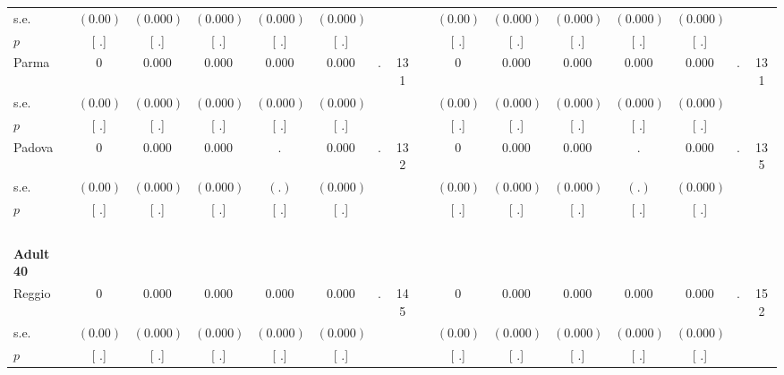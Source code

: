 \begin{longtable}{L{8em} c c c c c c c p{1em} c c c c c c c}
\quad \quad \quad \quad s.e.& $ (     0.00)$ & $ (    0.000)$ & $ (    0.000)$ & $ (    0.000)$ & $ (    0.000)$ & & & & $ (     0.00)$ & $ (    0.000)$ & $ (    0.000)$ & $ (    0.000)$ & $ (    0.000)$ & &  \\*
\quad \quad \quad \quad $ p$ & [        .] & [        .] & [        .] & [        .] & [        .] & & & & [        .] & [        .] & [        .] & [        .] & [        .] & &  \\[1em]
\quad \quad \quad Parma& 0 &     0.000 &     0.000 &     0.000 &     0.000 &         . &       131 & & 0 &     0.000 &     0.000 &     0.000 &     0.000 &         . &       131  \\*
\quad \quad \quad \quad s.e.& $ (     0.00)$ & $ (    0.000)$ & $ (    0.000)$ & $ (    0.000)$ & $ (    0.000)$ & & & & $ (     0.00)$ & $ (    0.000)$ & $ (    0.000)$ & $ (    0.000)$ & $ (    0.000)$ & &  \\*
\quad \quad \quad \quad $ p$ & [        .] & [        .] & [        .] & [        .] & [        .] & & & & [        .] & [        .] & [        .] & [        .] & [        .] & &  \\[1em]
\quad \quad \quad Padova& 0 &     0.000 &     0.000 &         . &     0.000 &         . &       132 & & 0 &     0.000 &     0.000 &         . &     0.000 &         . &       135  \\*
\quad \quad \quad \quad s.e.& $ (     0.00)$ & $ (    0.000)$ & $ (    0.000)$ & $ (        .)$ & $ (    0.000)$ & & & & $ (     0.00)$ & $ (    0.000)$ & $ (    0.000)$ & $ (        .)$ & $ (    0.000)$ & &  \\*
\quad \quad \quad \quad $ p$ & [        .] & [        .] & [        .] & [        .] & [        .] & & & & [        .] & [        .] & [        .] & [        .] & [        .] & &  \\[1em]
~\\[1em]
\quad \quad \textbf{Adult 40} & & & & & & & & & & & & & & & \\* 
\quad \quad \quad Reggio& 0 &     0.000 &     0.000 &     0.000 &     0.000 &         . &       145 & & 0 &     0.000 &     0.000 &     0.000 &     0.000 &         . &       152  \\*
\quad \quad \quad \quad s.e.& $ (     0.00)$ & $ (    0.000)$ & $ (    0.000)$ & $ (    0.000)$ & $ (    0.000)$ & & & & $ (     0.00)$ & $ (    0.000)$ & $ (    0.000)$ & $ (    0.000)$ & $ (    0.000)$ & &  \\*
\quad \quad \quad \quad $ p$ & [        .] & [        .] & [        .] & [        .] & [        .] & & & & [        .] & [        .] & [        .] & [        .] & [        .] & &  \\[1em]

\end{longtable}
